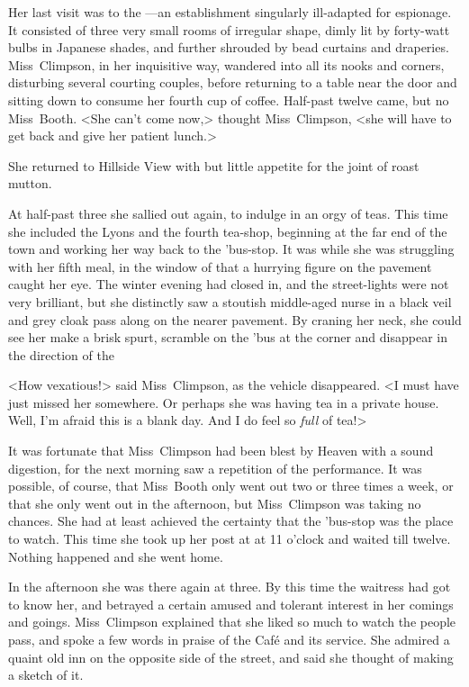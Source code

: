 Her last visit was to the —an establishment singularly ill-adapted for espionage. It consisted of three very small rooms of irregular shape, dimly lit by forty-watt bulbs in Japanese shades, and further shrouded by bead curtains and draperies. Miss~Climpson, in her inquisitive way, wandered into all its nooks and corners, disturbing several courting couples, before returning to a table near the door and sitting down to consume her fourth cup of coffee. Half-past twelve came, but no Miss~Booth. <She can't come now,> thought Miss~Climpson, <she will have to get back and give her patient lunch.>

She returned to Hillside View with but little appetite for the joint of roast mutton.

At half-past three she sallied out again, to indulge in an orgy of teas. This time she included the Lyons and the fourth tea-shop, beginning at the far end of the town and working her way back to the 'bus-stop. It was while she was struggling with her fifth meal, in the window of  that a hurrying figure on the pavement caught her eye. The winter evening had closed in, and the street-lights were not very brilliant, but she distinctly saw a stoutish middle-aged nurse in a black veil and grey cloak pass along on the nearer pavement. By craning her neck, she could see her make a brisk spurt, scramble on the 'bus at the corner and disappear in the direction of the 

<How vexatious!> said Miss~Climpson, as the vehicle disappeared. <I must have just missed her somewhere. Or perhaps she was having tea in a private house. Well, I'm afraid this is a blank day. And I do feel so \emph{full} of tea!>

It was fortunate that Miss~Climpson had been blest by Heaven with a sound digestion, for the next morning saw a repetition of the performance. It was possible, of course, that Miss~Booth only went out two or three times a week, or that she only went out in the afternoon, but Miss~Climpson was taking no chances. She had at least achieved the certainty that the 'bus-stop was the place to watch. This time she took up her post at  at 11 o'clock and waited till twelve. Nothing happened and she went home.

In the afternoon she was there again at three. By this time the waitress had got to know her, and betrayed a certain amused and tolerant interest in her comings and goings. Miss~Climpson explained that she liked so much to watch the people pass, and spoke a few words in praise of the Café and its service. She admired a quaint old inn on the opposite side of the street, and said she thought of making a sketch of it.

